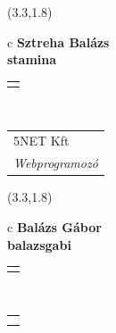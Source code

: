 \documentclass[11pt]{article}
\begin{document}
\makebox(3.3,1.8){
  \renewcommand\arraystretch{1.3}
  \begin{tabular}[c]{c}
    \hspace{8.5mm}
    \LARGE\bf{ Sztreha Balázs }\\
    \hspace{8.5mm}
    \Large{ stamina }\\
    \renewcommand\arraystretch{3}
    \begin{tabular}[c]{c}
      \centering
      \fontfamily{phv}\selectfont{
        \textbf{
          \textsc{
            \scriptsize{
            \color{Bright}{ Ismerkedő }\color{Dark}{ Webmester }\color{Bright}{ Sminkmester }\color{Dark}{ Programozó }
            }
          }
        }
      }
    \end{tabular}
    \\
    \renewcommand\arraystretch{1}
    \begin{tabular}{p{3.3in}}
      \hspace{.7cm}5NET Kft\\
      \hspace{.7cm}\emph{ Webprogramozó }\\
    \end{tabular}
  \end{tabular}
}

\makebox(3.3,1.8){
  \renewcommand\arraystretch{1.3}
  \begin{tabular}[c]{c}
    \hspace{8.5mm}
    \LARGE\bf{ Balázs Gábor }\\
    \hspace{8.5mm}
    \Large{ balazsgabi }\\
    \renewcommand\arraystretch{3}
    \begin{tabular}[c]{c}
      \centering
      \fontfamily{phv}\selectfont{
        \textbf{
          \textsc{
            \scriptsize{
            \color{Dark}{ Ismerkedő }\color{Bright}{ Webmester }\color{Bright}{ Sminkmester }\color{Bright}{ Programozó }
            }
          }
        }
      }
    \end{tabular}
    \\
    \renewcommand\arraystretch{1}
    \begin{tabular}{p{3.3in}}
      \hspace{.7cm}\\
      \hspace{.7cm}\emph{  }\\
    \end{tabular}
  \end{tabular}
}
\end{document}
